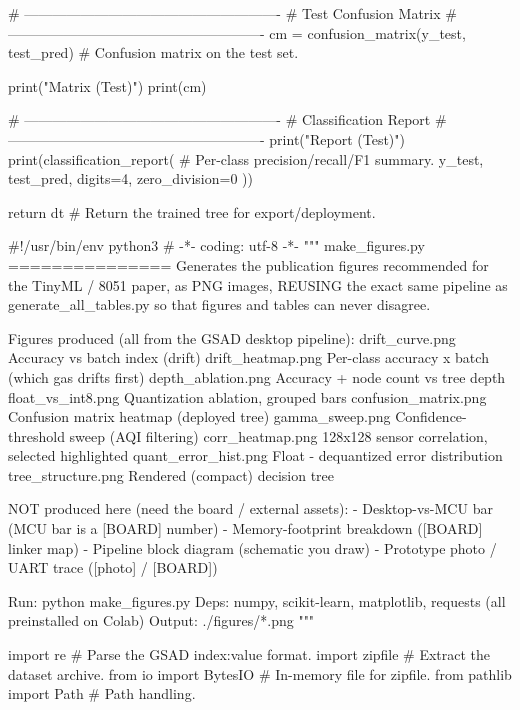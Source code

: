     # -------------------------------------------------------
    # Test Confusion Matrix
    # -------------------------------------------------------
    cm = confusion_matrix(y_test, test_pred)  # Confusion matrix on the test set.

    print("\nConfusion Matrix (Test)")
    print(cm)

    # -------------------------------------------------------
    # Classification Report
    # -------------------------------------------------------
    print("\nClassification Report (Test)")
    print(classification_report(           # Per-class precision/recall/F1 summary.
        y_test,
        test_pred,
        digits=4,
        zero_division=0
    ))

    return dt                              # Return the trained tree for export/deployment.        



    #!/usr/bin/env python3
# -*- coding: utf-8 -*-
"""
make_figures.py
===============
Generates the publication figures recommended for the TinyML / 8051 paper,
as PNG images, REUSING the exact same pipeline as generate_all_tables.py so
that figures and tables can never disagree.

Figures produced (all from the GSAD desktop pipeline):
  drift_curve.png                 Accuracy vs batch index (drift)
  drift_heatmap.png               Per-class accuracy x batch (which gas drifts first)
  depth_ablation.png              Accuracy + node count vs tree depth
  float_vs_int8.png               Quantization ablation, grouped bars
  confusion_matrix.png            Confusion matrix heatmap (deployed tree)
  gamma_sweep.png                 Confidence-threshold sweep (AQI filtering)
  corr_heatmap.png                128x128 sensor correlation, selected highlighted
  quant_error_hist.png            Float - dequantized error distribution
  tree_structure.png              Rendered (compact) decision tree

NOT produced here (need the board / external assets):
  - Desktop-vs-MCU bar (MCU bar is a [BOARD] number)
  - Memory-footprint breakdown ([BOARD] linker map)
  - Pipeline block diagram (schematic you draw)
  - Prototype photo / UART trace ([photo] / [BOARD])

Run:  python make_figures.py
Deps: numpy, scikit-learn, matplotlib, requests  (all preinstalled on Colab)
Output: ./figures/*.png
"""

import re                                          # Parse the GSAD index:value format.
import zipfile                                     # Extract the dataset archive.
from io import BytesIO                             # In-memory file for zipfile.
from pathlib import Path                           # Path handling.

